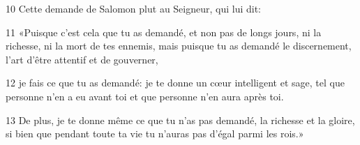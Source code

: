 
10 Cette demande de Salomon plut au Seigneur, qui lui dit:

11 «Puisque c’est cela que tu as demandé, et non pas de longs jours, ni la richesse, ni la mort de tes ennemis, mais puisque tu as demandé le discernement, l’art d’être attentif et de gouverner,

12 je fais ce que tu as demandé: je te donne un cœur intelligent et sage, tel que personne n’en a eu avant toi et que personne n’en aura après toi.

13 De plus, je te donne même ce que tu n’as pas demandé, la richesse et la gloire, si bien que pendant toute ta vie tu n’auras pas d’égal parmi les rois.»
